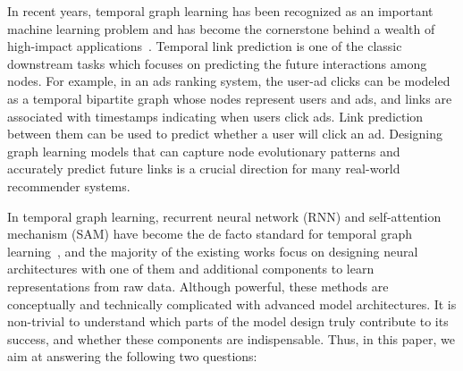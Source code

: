 




In recent years, temporal graph learning has been recognized as an important machine learning problem and has become the cornerstone behind a wealth of high-impact applications~\cite{yu2018spatio,bui2021spatial,kazemi2020representation,zhou2020graph,Cong2021DyFormerAS}.
Temporal link prediction is one of the classic downstream tasks %
which focuses on predicting the future interactions among nodes.
For example, in an ads ranking system, the user-ad clicks can be modeled as a temporal bipartite graph whose nodes represent users and ads, and links are associated with timestamps indicating when users click ads. Link prediction between them can be used to predict whether a user will click an ad. %
Designing graph learning models that can capture node evolutionary patterns and accurately predict future links is a crucial direction for many real-world recommender systems.



In temporal graph learning, recurrent neural network (RNN) and self-attention mechanism (SAM) have become the de facto standard for temporal graph learning~\cite{kumar2019predicting,sankar2020dysat,xu2020inductive,tgn_icml_grl2020,wang2020inductive}, and the majority of the existing works focus on designing neural architectures with one of them and additional components to learn representations from raw data.
Although powerful, these methods are conceptually
and technically complicated with advanced model architectures. It is non-trivial to understand which parts of the model design truly contribute to its success, and whether these components are indispensable.
Thus, in this paper, we aim at answering the following two questions:

